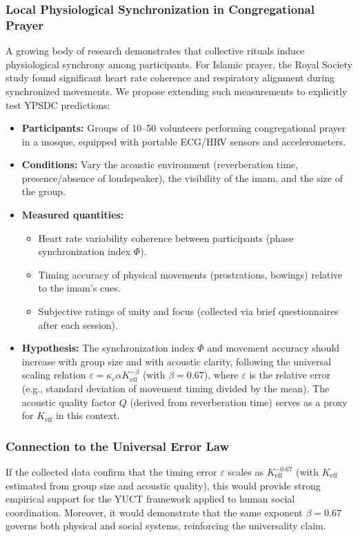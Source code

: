 \documentclass[12pt,a4paper]{article}
\newcommand{\Keff}{K_{\mathrm{eff}}}   %
\begin{document}
	\subsubsection{Local Physiological Synchronization in Congregational Prayer}
	A growing body of research demonstrates that collective rituals induce physiological synchrony among participants. For Islamic prayer, the Royal Society study \cite{RoyalSociety2024} found significant heart rate coherence and respiratory alignment during synchronized movements. We propose extending such measurements to explicitly test YPSDC predictions:
	
	\begin{itemize}
		\item \textbf{Participants:} Groups of 10–50 volunteers performing congregational prayer in a mosque, equipped with portable ECG/HRV sensors and accelerometers.
		\item \textbf{Conditions:} Vary the acoustic environment (reverberation time, presence/absence of loudspeaker), the visibility of the imam, and the size of the group.
		\item \textbf{Measured quantities:} 
		\begin{itemize}
			\item Heart rate variability coherence between participants (phase synchronization index \(\Phi\)).
			\item Timing accuracy of physical movements (prostrations, bowings) relative to the imam’s cues.
			\item Subjective ratings of unity and focus (collected via brief questionnaires after each session).
		\end{itemize}
		\item \textbf{Hypothesis:} The synchronization index \(\Phi\) and movement accuracy should increase with group size and with acoustic clarity, following the universal scaling relation \(\varepsilon = \kappa_c \alpha \Keff^{-\beta}\) (with \(\beta=0.67\)), where \(\varepsilon\) is the relative error (e.g., standard deviation of movement timing divided by the mean). The acoustic quality factor \(Q\) (derived from reverberation time) serves as a proxy for \(\Keff\) in this context.
	\end{itemize}
	
	\subsubsection{Connection to the Universal Error Law}
	If the collected data confirm that the timing error \(\varepsilon\) scales as \(\Keff^{-0.67}\) (with \(\Keff\) estimated from group size and acoustic quality), this would provide strong empirical support for the YUCT framework applied to human social coordination. Moreover, it would demonstrate that the same exponent \(\beta=0.67\) governs both physical and social systems, reinforcing the universality claim.
	
\end{document}

